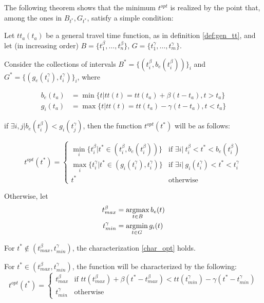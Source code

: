 The following theorem shows that the minimum \(t^{opt}\) is realized by the point that,
among the ones in \(B_{t^*}, G_{t^*}\),
satisfy a simple condition:
\begin{theorem}
  \label{theo:characterization}
    Let \(tt_a(t_a)\) be a general travel time function, as in definition \ref{def:gen_tt},
  and let (in increasing order) \(B = \{t^\beta_1, \dots, t^\beta_n\}\), \(G = \{t^\gamma_1, \dots, t^\gamma_m\}\).


  Consider the collections of intervals \(B^* = \{(t^\beta_i, b_e(t^\beta_i))\}_i\) and \(G^* = \{(g_e(t^\gamma_i), t^\gamma_i)\}_i\), where

  \begin{align*}
    b_e(t_a) & = \min\{t | tt(t) = tt(t_a) + \beta(t - t_a), t > t_a\} \\
    g_i(t_a) & = \max\{t | tt(t) = tt(t_a) - \gamma(t - t_a), t < t_a\}
  \end{align*}
  
  if \(\exists i, j |b_e(t^\beta_i) < g_i(t^\gamma_j)\), then the function \(t^{opt}(t^*)\) will be as follows:

  \begin{equation}
    \label{char_opt}
    t^{opt}(t^*) = 
    \begin{cases}
      \min_i \{t^\beta_i | t^* \in (t^\beta_i, b_e(t^\beta_i))\} & \text{if } \exists i |\ t^\beta_i < t^* < b_e(t^\beta_i) \\
      \max_i \{t^\gamma_i | t^* \in (g_i(t^\gamma_i), t^\gamma_i)\} & \text{if } \exists i |\ g_i(t^\gamma_i) < t^* < t^\gamma_i \\
      t^* & \text{otherwise}
    \end{cases}
  \end{equation}

  Otherwise, let
  \begin{align*}
    t^\beta_{max} & = \operatorname*{argmax}_{t \in B}b_e(t) \\
    t^\gamma_{min} & = \operatorname*{argmin}_{t \in G}g_i(t)
  \end{align*}

  For \(t^* \notin (t^\beta_{max}, t^\gamma_{min})\), the characterization \eqref{char_opt} holds.

  For \(t^* \in (t^\beta_{max}, t^\gamma_{min})\), the function will be characterized by the following:
  \begin{equation}
    \label{eq:char_strange}
    t^{opt}(t^*) =
    \begin{cases}
      t^\beta_{max} & \text{if } tt(t^\beta_{max}) + \beta(t^* - t^\beta_{max}) < tt(t^\gamma_{min}) - \gamma(t^* - t^\gamma_{min}) \\
      t^\gamma_{min} & \text{otherwise}
    \end{cases}
  \end{equation}
\end{theorem}


